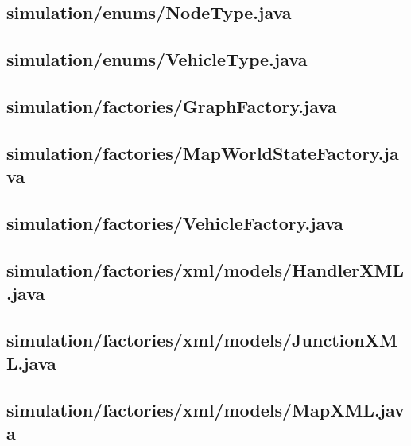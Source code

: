 \subsection{simulation/enums/NodeType.java}

\newpage
\subsection{simulation/enums/VehicleType.java}

\newpage
\subsection{simulation/factories/GraphFactory.java}

\newpage
\subsection{simulation/factories/MapWorldStateFactory.java}

\newpage
\subsection{simulation/factories/VehicleFactory.java}

\newpage
\subsection{simulation/factories/xml/models/HandlerXML.java}

\newpage
\subsection{simulation/factories/xml/models/JunctionXML.java}

\newpage
\subsection{simulation/factories/xml/models/MapXML.java}

\newpage
